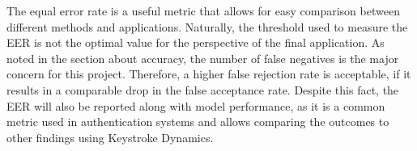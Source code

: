 The equal error rate is a useful metric that allows for easy comparison between different methods and applications. Naturally, the threshold used to measure the EER is not the optimal value for the perspective of the final application. As noted in the section about accuracy, the number of false negatives is the major concern for this project. Therefore, a higher false rejection rate is acceptable, if it results in a comparable drop in the false acceptance rate. Despite this fact, the EER will also be reported along with model performance, as it is a common metric used in authentication systems and allows comparing the outcomes to other findings using Keystroke Dynamics.
